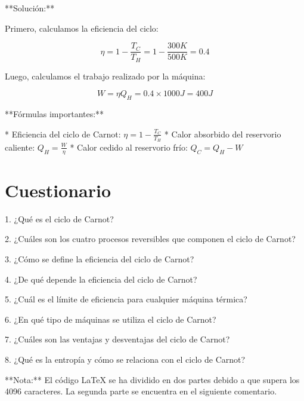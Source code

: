 \documentclass[../main]{subfiles}
\begin{document}
**Solución:**

Primero, calculamos la eficiencia del ciclo:

$$\eta = 1 - \frac{T_C}{T_H} = 1 - \frac{300 K}{500 K} = 0.4$$

Luego, calculamos el trabajo realizado por la máquina:

$$W = \eta Q_H = 0.4 \times 1000 J = 400 J$$

**Fórmulas importantes:**

* Eficiencia del ciclo de Carnot: $\eta = 1 - \frac{T_C}{T_H}$
* Calor absorbido del reservorio caliente: $Q_H = \frac{W}{\eta}$
* Calor cedido al reservorio frío: $Q_C = Q_H - W$

\section{Cuestionario}

1. ¿Qué es el ciclo de Carnot?

2. ¿Cuáles son los cuatro procesos reversibles que componen el ciclo de Carnot?

3. ¿Cómo se define la eficiencia del ciclo de Carnot?

4. ¿De qué depende la eficiencia del ciclo de Carnot?

5. ¿Cuál es el límite de eficiencia para cualquier máquina térmica?

6. ¿En qué tipo de máquinas se utiliza el ciclo de Carnot?

7. ¿Cuáles son las ventajas y desventajas del ciclo de Carnot?

8. ¿Qué es la entropía y cómo se relaciona con el ciclo de Carnot?

**Nota:** El código LaTeX se ha dividido en dos partes debido a que supera los 4096 caracteres. La segunda parte se encuentra en el siguiente comentario.
\end{document}
